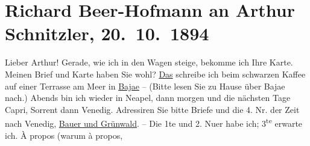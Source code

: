 

         
         \newcommand{\erwaehntePersonen}{Personen: Hermann Bahr, Max Eugen Burckhard, Guy de Maupassant}
         \newcommand{\erwaehnteInstitutionen}{Institutionen: Deutscher Schulverein, Die Zeit. Wiener Wochenschrift}
         \newcommand{\erwaehnteOrte}{Orte: Baia, Capri, Grand Hotel Bauer-Grünwald, Neapel, Pallanza, Prag, Sorrent, Venedig, Wien}
         \newcommand{\erwaehnteWerke}{Werke: Der Abonnent, Die Schmetterlingsschlacht. Komödie in 4 Akten, Die Zeit. Wiener Wochenschrift, Dora}
               \section[Richard Beer-Hofmann an Arthur Schnitzler, 20. 10. 1894]{ Richard Beer-Hofmann an Arthur Schnitzler, 20. 10. 1894}\nopagebreak{}\rehead{ }\begin{ledgroupsized}[t]{13cm}\normalsize\beginnumbering \toendnotes[C]{\smallbreak\pagebreak[2]} 
\toendnotes[C]{\smallbreak}\pstart
           \noindent{}{\pb}Lieber Arthur!
                    Gerade, wie ich in den Wagen steige, bekomme ich Ihre Karte. Meinen
                    Brief  und Karte haben Sie wohl?\pend
           \pstart
           \uline{Das}
               schreibe ich beim schwarzen Kaffee auf einer
                    Terrasse am Meer in \uline{Bajae} – (Bitte lesen Sie zu Hause über Bajae
                    nach.) Abends bin ich wieder in Neapel, dann
                    morgen und die nächsten Tage Capri,
                        Sorrent dann Venedig. Adressiren Sie bitte Briefe und die 4. Nr. der
                        Zeit nach Venedig,
                            \uline{Bauer und Grünwald}. – Die 1te und 2. Nu{\geminationm}er habe ich; 3\textsuperscript{te} erwarte ich. {\pb}À propos (warum à propos,

\end{ledgroupsized}
